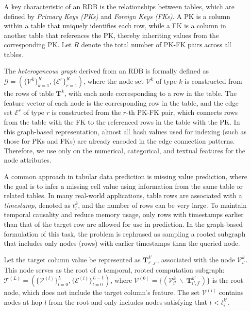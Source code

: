 \documentclass{article}
\theoremstyle{plain}
\theoremstyle{definition}
\theoremstyle{remark}
\begin{document}
A key characteristic of an RDB is the relationships between tables, which are defined by \textit{Primary Keys (PKs)} and \textit{Foreign Keys (FKs)}. A PK is a column within a table that uniquely identifies each row, while a FK is a column in another table that references the PK, thereby inheriting values from the corresponding PK. Let $R$ denote the total number of PK-FK pairs across all tables.

The \textit{heterogeneous graph} derived from an RDB is formally defined as $\mathcal{G} = (\{\mathcal{V}^k\}_{k=1}^{K}, \{\mathcal{E}^r\}_{r=1}^{R})$, where the node set $\mathcal{V}^k$ of type $k$ is constructed from the rows of table $\bm{T}^k$, with each node corresponding to a row in the table. The feature vector of each node is the corresponding row in the table, and the edge set $\mathcal{E}^r$ of type $r$ is constructed from the $r$-th PK-FK pair, which connects rows from the table with the FK to the referenced rows in the table with the PK. In this graph-based representation, almost all hash values used for indexing (such as those for PKs and FKs) are already encoded in the edge connection patterns. Therefore, we use only on the numerical, categorical, and textual features for the node attributes.

A common approach in tabular data prediction is missing value prediction, where the goal is to infer a missing cell value using information from the same table or related tables. In many real-world applications, table rows are associated with a \textit{timestamp}, denoted as $t_{i}^{k}$, and the number of rows can be very large. To maintain temporal causality and reduce memory usage, only rows with timestamps earlier than that of the target row are allowed for use in prediction. In the graph-based formulation of this task, the problem is rephrased as sampling a rooted subgraph that includes only nodes (rows) with earlier timestamps than the queried node.

Let the target column value be represented as $\bm{T}^{k’}_{i’, j’}$, associated with the node $\mathcal{V}^k_{i’}$. This node serves as the root of a temporal, rooted computation subgraph:
$\mathcal{T}^{(L)} = \left( \{ \mathcal{V}^{(l)} \}_{l=0}^{L}, \{ \mathcal{E}^{(l)} \}_{l=0}^{L-1} \right)$, where $\mathcal{V}^{(0)} = \{ ( \mathcal{V}^k_{i’} ~\backslash~ \bm{T}^{k’}_{i’, j’}) \}$ is the root node, which does not include the target column’s feature. The set $\mathcal{V}^{(l)}$ contains nodes at hop $l$ from the root and only includes nodes satisfying that $t < t_{i’}^{k’}$.
\end{document}

